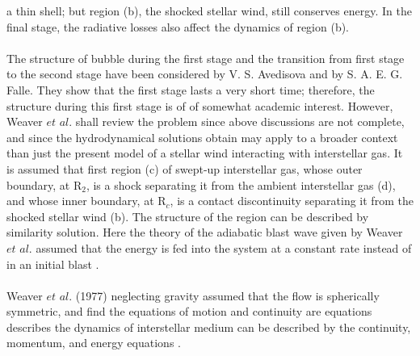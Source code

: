 \documentclass[fleqn,a4paper,12pt,oneside]{article}
\begin{document}
a thin shell; but region (b), the shocked stellar wind, still
conserves energy. In the final stage, the radiative losses also
affect the dynamics of region (b).
\\
\\
The structure of bubble during the first stage and the
transition from  first stage to the second stage have been
considered by V. S. Avedisova  and by S. A. E. G. Falle. They show
that the first stage lasts a very short time; therefore, the
structure during this first stage is of of somewhat academic
interest. However, Weaver $et$ $al$. shall review the problem
since  above discussions are not complete, and since the
hydrodynamical solutions obtain may apply to a broader context
than just the present model of a stellar wind interacting with
interstellar gas. It is assumed that first region (c) of
swept-up interstellar gas, whose outer boundary, at R$_{2}$, is
a shock separating it from the ambient interstellar gas (d), and
whose inner boundary, at R$_{c}$, is a contact discontinuity
separating it from the shocked stellar wind (b). The structure
of the region can be described by similarity solution.
Here the theory of the adiabatic blast wave given by Weaver $et$ $al.$\cite{10} assumed that the energy is
fed into the system at a constant rate instead of in an initial
blast \cite{10}.
\\\\
Weaver $et$ $al$. (1977) neglecting gravity assumed that the flow is spherically
symmetric, and find the equations of motion and
continuity are equations describes the dynamics of  interstellar
medium can be described by the continuity, momentum, and energy
equations \cite{10}.
\end{document}
